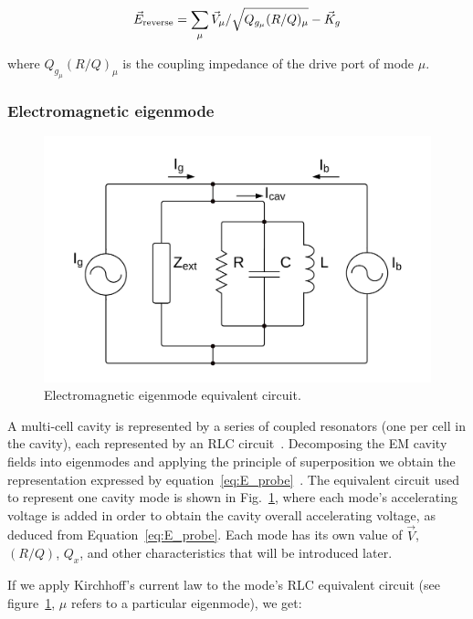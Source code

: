 \documentclass[a4paper,12pt]{article}
\begin{document}
\begin{equation}
  \vec E_{\rm reverse}=\sum_\mu \vec V_\mu / \sqrt{Q_{g_{\mu}}(R/Q)_\mu} - \vec K_g
  \label{eq:E_reverse}
\end{equation}

\noindent where $Q_{g_{\mu}}(R/Q)_\mu$ is the coupling impedance of the drive port of mode $\mu$.

\subsubsection{Electromagnetic eigenmode}

\begin{figure}
\centering
\includegraphics[scale=0.20]{../figures/cavity_eq_circuit.png}
\caption{Electromagnetic eigenmode equivalent circuit.}
\label{fig:cav_eq_circuit}
\end{figure}

A multi-cell cavity is represented by a series of coupled resonators (one per cell in the cavity), each represented by an RLC circuit~\cite{ref:montgomery}. Decomposing the EM cavity fields into eigenmodes and applying the principle of superposition we obtain the representation expressed by equation~\ref{eq:E_probe}~\cite{ref:cell_modes}. The equivalent circuit used to represent one cavity mode is shown in Fig.~\ref{fig:cav_eq_circuit}, where each mode's accelerating voltage is added in order to obtain the cavity overall accelerating voltage, as deduced from Equation~\ref{eq:E_probe}. Each mode has its own value of $\vec V$, $(R/Q)$, $Q_x$, and other characteristics that will be introduced later.

If we apply Kirchhoff's current law to the mode's RLC equivalent circuit (see figure~\ref{fig:cav_eq_circuit}, $\mu$ refers to a particular eigenmode), we get:
\end{document}
